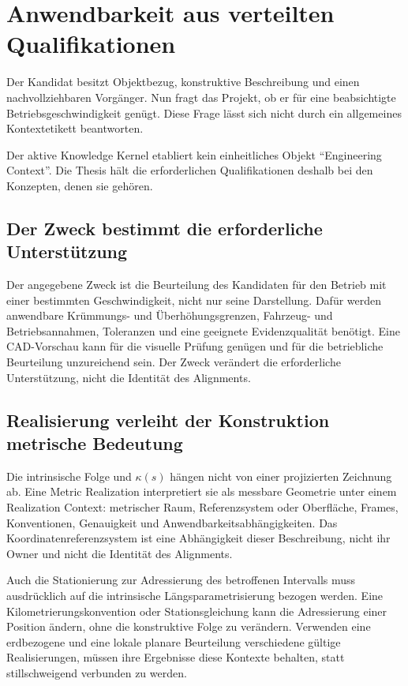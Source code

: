 
\chapter{Anwendbarkeit aus verteilten Qualifikationen}
\label{chap:engineering-context}

Der Kandidat besitzt Objektbezug, konstruktive Beschreibung und einen
nachvollziehbaren Vorgänger. Nun fragt das Projekt, ob er für eine beabsichtigte
Betriebsgeschwindigkeit genügt. Diese Frage lässt sich nicht durch ein
allgemeines Kontextetikett beantworten.

Der aktive Knowledge Kernel etabliert kein einheitliches Objekt ``Engineering
Context''. Die Thesis hält die erforderlichen Qualifikationen deshalb bei den
Konzepten, denen sie gehören.

\section{Der Zweck bestimmt die erforderliche Unterstützung}

Der angegebene Zweck ist die Beurteilung des Kandidaten für den Betrieb mit
einer bestimmten Geschwindigkeit, nicht nur seine Darstellung. Dafür werden
anwendbare Krümmungs- und Überhöhungsgrenzen, Fahrzeug- und Betriebsannahmen,
Toleranzen und eine geeignete Evidenzqualität benötigt. Eine CAD-Vorschau kann
für die visuelle Prüfung genügen und für die betriebliche Beurteilung
unzureichend sein. Der Zweck verändert die erforderliche Unterstützung, nicht
die Identität des Alignments.

\section{Realisierung verleiht der Konstruktion metrische Bedeutung}

Die intrinsische Folge und $\kappa(s)$ hängen nicht von einer projizierten
Zeichnung ab. Eine Metric Realization interpretiert sie als messbare Geometrie
unter einem Realization Context: metrischer Raum, Referenzsystem oder
Oberfläche, Frames, Konventionen, Genauigkeit und
Anwendbarkeitsabhängigkeiten. Das Koordinatenreferenzsystem ist eine
Abhängigkeit dieser Beschreibung, nicht ihr Owner und nicht die Identität des
Alignments.

Auch die Stationierung zur Adressierung des betroffenen Intervalls muss
ausdrücklich auf die intrinsische Längsparametrisierung bezogen werden. Eine
Kilometrierungskonvention oder Stationsgleichung kann die Adressierung einer
Position ändern, ohne die konstruktive Folge zu verändern. Verwenden eine
erdbezogene und eine lokale planare Beurteilung verschiedene gültige
Realisierungen, müssen ihre Ergebnisse diese Kontexte behalten, statt
stillschweigend verbunden zu werden.

